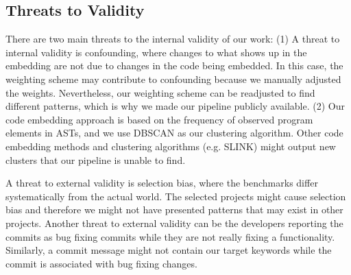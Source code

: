 

\subsection{Threats to Validity}

There are two main threats to the internal validity of our work: (1) A threat to internal validity is confounding, where changes to what shows up in the embedding are not due to changes in the code being embedded. In this case, the weighting scheme may contribute to confounding because we manually adjusted the weights. Nevertheless, our weighting scheme can be readjusted to find different patterns, which is why we made our pipeline publicly available. (2) Our code embedding approach is based on the frequency of observed program elements in ASTs, and we use DBSCAN as our clustering algorithm. Other code embedding methods and clustering algorithms (e.g. SLINK) might output new clusters that our pipeline is unable to find.

A threat to external validity is selection bias, where the benchmarks differ systematically from the actual world. The selected projects might cause selection bias and therefore we might not have presented patterns that may exist in other projects. Another threat to external validity can be the developers reporting the commits as bug fixing commits while they are not really fixing a functionality. Similarly, a commit message might not contain our target keywords while the commit is associated with bug fixing changes.

